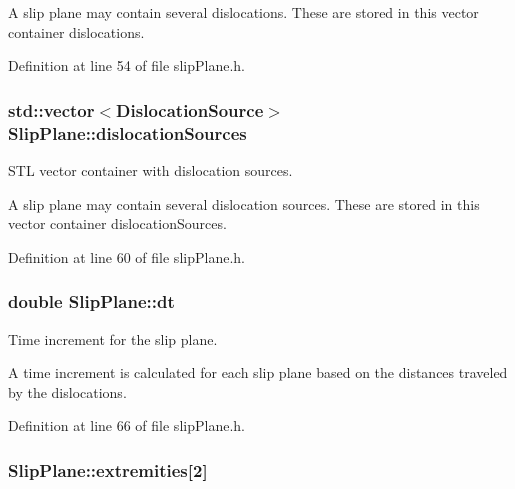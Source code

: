 A slip plane may contain several dislocations. These are stored in this vector container dislocations. 

Definition at line 54 of file slip\-Plane.\-h.

\hypertarget{classSlipPlane_a8e31e904fc6e68cc7ba70b0b57a278cc}{
\subsubsection[{dislocation\-Sources}]{\setlength{\rightskip}{0pt plus 5cm}std\-::vector$<${\bf Dislocation\-Source}$>$ Slip\-Plane\-::dislocation\-Sources\hspace{0.3cm}{\ttfamily [protected]}}}\label{db/d25/classSlipPlane_a8e31e904fc6e68cc7ba70b0b57a278cc}


S\-T\-L vector container with dislocation sources. 

A slip plane may contain several dislocation sources. These are stored in this vector container dislocation\-Sources. 

Definition at line 60 of file slip\-Plane.\-h.

\hypertarget{classSlipPlane_ad786135547799363ad2931e43522c2be}{
\subsubsection[{dt}]{\setlength{\rightskip}{0pt plus 5cm}double Slip\-Plane\-::dt\hspace{0.3cm}{\ttfamily [protected]}}}\label{db/d25/classSlipPlane_ad786135547799363ad2931e43522c2be}


Time increment for the slip plane. 

A time increment is calculated for each slip plane based on the distances traveled by the dislocations. 

Definition at line 66 of file slip\-Plane.\-h.

\hypertarget{classSlipPlane_abbdbe6ed805faf3777b54ff55a9c089c}{
\subsubsection[{extremities}]{ Slip\-Plane\-::extremities\mbox{[}2\mbox{]}\hspace{0.3cm}{\ttfamily [protected]}}}\label{db/d25/classSlipPlane_abbdbe6ed805faf3777b54ff55a9c089c}


